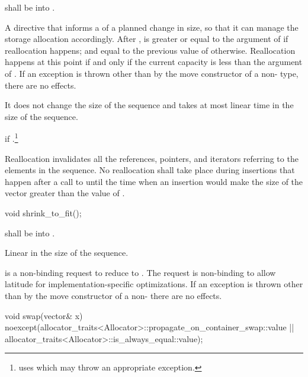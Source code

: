 \begin{itemdescr}
\pnum
\requires {} shall be  into .

\pnum
\effects
A directive that informs a
of a planned change in size, so that it can manage the storage allocation accordingly.
After
,
is greater or equal to the argument of
if reallocation happens; and equal to the previous value of
otherwise.
Reallocation happens at this point if and only if the current capacity is less than the
argument of
. If an exception is thrown
other than by the move constructor of a non- type,
there are no effects.

\pnum
\complexity
It does not change the size of the sequence and takes at most linear
time in the size of the sequence.

\pnum
\throws
{} if .\footnote{ uses  which
may throw an appropriate exception.}

\pnum
\notes
Reallocation invalidates all the references, pointers, and iterators
referring to the elements in the sequence.
No reallocation shall take place during insertions that happen
after a call to
until the time when an insertion would make the size of the vector
greater than the value of
.
\end{itemdescr}

%
\begin{itemdecl}
void shrink_to_fit();
\end{itemdecl}

\begin{itemdescr}
\pnum
\requires {} shall be  into .

\pnum
\complexity Linear in the size of the sequence.

\pnum
\notes {} is a non-binding request to reduce  to . \enternote The request is non-binding to allow latitude for implementation-specific optimizations. \exitnote
If an exception is thrown other than by the move constructor of a non-  there are no effects.
\end{itemdescr}

%
\begin{itemdecl}
void swap(vector& x)
  noexcept(allocator_traits<Allocator>::propagate_on_container_swap::value ||
           allocator_traits<Allocator>::is_always_equal::value);
\end{itemdecl}

